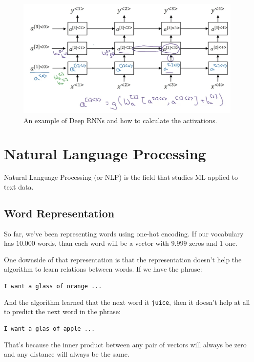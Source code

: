 \documentclass[12pt, a4paper, oneside]{book}
\begin{document}
\begin{figure}[h]
\centering
\includegraphics[scale=0.4]{Res/DRNN.jpg}
\caption{An example of Deep RNNs and how to calculate the activations.}
\label{DRNN.jpg}
\end{figure}

\section{Natural Language Processing}%
\label{sec:natural_language_processing}

Natural Language Processing (or NLP) is the field that studies ML applied to
text data.

\subsection{Word Representation}%
\label{sub:word_representation}

So far, we've been representing words using one-hot encoding. If our vocabulary
has $10.000$ words, than each word will be a vector with $9.999$ zeros and $1$
one.

One downside of that representation is that the representation doesn't help the
algorithm to learn relations between words. If we have the phrase:

\begin{center}
\texttt{I want a glass of orange ...}
\end{center}

And the algorithm learned that the next word it \texttt{juice}, then it doesn't
help at all to predict the next word in the phrase:

\begin{center}
\texttt{I want a glas of apple ...}
\end{center}

That's because the inner product between any pair of vectors will always be zero
and any distance will always be the same. \jump
\end{document}
